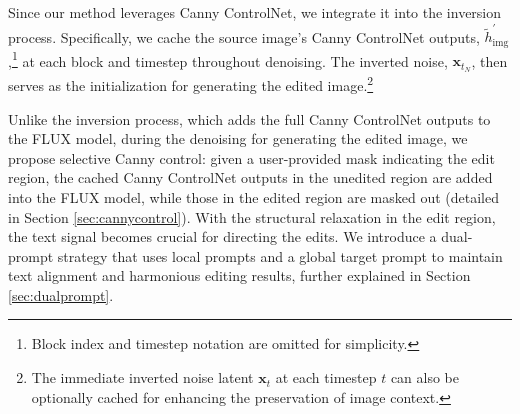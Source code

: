 \documentclass{article}
\newenvironment{cyanpar}{\color{cyan}}{}
\begin{document}
\begin{cyanpar}
%


Since our method leverages Canny ControlNet, we integrate it into the inversion process. Specifically, we cache the source image's Canny ControlNet outputs, $\tilde{h}^{\prime}_{\text{img}}$,\footnote{Block index and timestep notation are omitted for simplicity.} at each block and timestep throughout denoising. The inverted noise, $\mathbf{x}_{t_N}$, then serves as the initialization for generating the edited image.\footnote{The immediate inverted noise latent $\mathbf{x}_t$ at each timestep $t$ can also be optionally cached for enhancing the preservation of image context.}


Unlike the inversion process, which adds the full Canny ControlNet outputs to the FLUX model, during the denoising for generating the edited image, we propose selective Canny control: given a user-provided mask indicating the edit region, the cached Canny ControlNet outputs in the unedited region are added into the FLUX model, while those in the edited region are masked out (detailed in Section \ref{sec:cannycontrol}). With the structural relaxation in the edit region, the text signal becomes crucial for directing the edits. We introduce a dual-prompt strategy that uses local prompts and a global target prompt to maintain text alignment and harmonious editing results, further explained in Section \ref{sec:dualprompt}.


\end{cyanpar}
\end{document}
